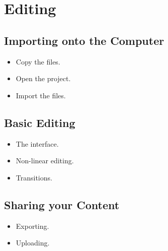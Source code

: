 \documentclass[letterpaper]{latexclasses/tmarticle}
\begin{document}
\section{Editing}

\subsection{Importing onto the Computer}

\begin{itemize}
    \item
    Copy the files.
    
    \item
    Open the project.
    
    \item
    Import the files.

\end{itemize}

\subsection{Basic Editing}

\begin{itemize}
    \item
    The interface.
    
    \item
    Non-linear editing.
    
    \item
    Transitions.

\end{itemize}

\subsection{Sharing your Content}

\begin{itemize}
    \item
    Exporting.
    
    \item
    Uploading.

\end{itemize}
\end{document}
